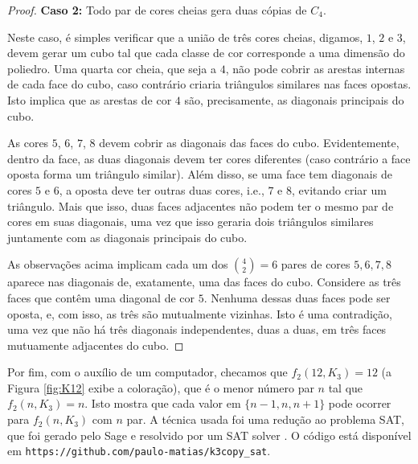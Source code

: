 \documentclass[12pt,a4paper]{book}
\begin{document}
\begin{proof}
\medskip
\textbf{Caso 2:} Todo par de cores cheias gera duas cópias de $C_4$.

Neste caso, é simples verificar que a união de três cores cheias, digamos, $1$, $2$ e $3$, devem gerar um cubo  tal que cada classe de cor corresponde a uma dimensão do poliedro. Uma quarta cor cheia, que seja a $4$, não pode cobrir as arestas internas de cada face do cubo, caso contrário criaria triângulos similares nas faces opostas.
Isto implica que as arestas de cor $4$ são, precisamente, as diagonais principais do cubo.

As cores $5$, $6$, $7$, $8$ devem cobrir as diagonais das faces do cubo. Evidentemente, dentro da face, as duas diagonais devem ter cores diferentes (caso contrário a face oposta forma um triângulo similar).
Além disso, se uma face tem diagonais de cores $5$ e $6$, a oposta  deve ter outras duas cores, i.e., $7$ e $8$, evitando criar um triângulo. 
Mais que isso, duas faces adjacentes não podem ter o mesmo par de cores em suas diagonais, uma vez que isso geraria dois triângulos similares juntamente com as diagonais principais do cubo.

As observações acima implicam cada um dos $\binom{4}{2}=6$ pares de cores $5,6,7,8$ aparece nas diagonais de, exatamente, uma das faces do cubo.
Considere as três faces que contêm uma diagonal de cor $5$.
Nenhuma dessas duas faces pode ser oposta, e, com isso, as três são mutualmente vizinhas. Isto é uma contradição, uma vez que não há três diagonais independentes, duas a duas, em três faces mutuamente adjacentes do cubo.
\end{proof}

Por fim, com o auxílio de um computador, checamos que $f_2(12,K_3) = 12$ (a Figura \ref{fig:K12} exibe a coloração), que é o menor número par $n$ tal que $f_2(n,K_3) = n$. Isto mostra que cada valor em $\{n - 1, n, n + 1\}$ pode ocorrer para $f_2(n,K_3)$ com $n$ par.
A técnica usada foi uma redução ao problema SAT, que foi gerado pelo Sage \cite{sagemath} e resolvido por um SAT solver \cite{lingeling}. 
O código está disponível em   %
\texttt{https://github.com/paulo-matias/k3copy\_sat}.
\end{document}
